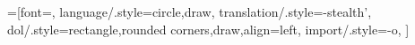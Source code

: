 \usetikzlibrary{shadows,shapes,positioning,arrows}
=[font=\sffamily,
    language/.style={circle,draw},
    translation/.style={-stealth'},
    dol/.style={rectangle,rounded corners,draw,align=left},
    import/.style={-o},
]

